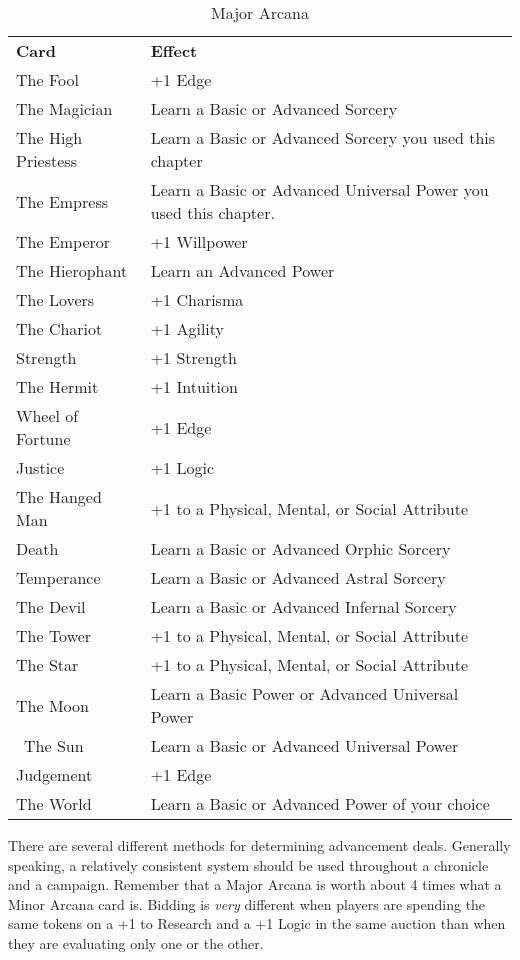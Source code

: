 \begin{table}[htb]
 \caption{Major Arcana} \centering
\begin{tabular}{l l}
\textbf{Card} & \textbf{Effect}\\
The Fool & +1 Edge\\
The Magician & Learn a Basic or Advanced Sorcery\\
The High Priestess & Learn a Basic or Advanced Sorcery you used this chapter\\
The Empress & Learn a Basic or Advanced Universal Power  you used this chapter.\\
The Emperor & +1 Willpower\\
The Hierophant & Learn an Advanced Power\\
The Lovers & +1 Charisma\\
The Chariot & +1 Agility\\
Strength & +1 Strength\\
The Hermit & +1 Intuition\\
Wheel of Fortune & +1 Edge\\
Justice & +1 Logic\\
The Hanged Man & +1 to a Physical, Mental, or Social Attribute\\
Death & Learn a Basic or Advanced Orphic Sorcery\\
Temperance & Learn a Basic or Advanced Astral Sorcery\\
The Devil & Learn a Basic or Advanced Infernal Sorcery\\
The Tower & +1 to a Physical, Mental, or Social Attribute\\
The Star & +1 to a Physical, Mental, or Social Attribute\\
The Moon & Learn a Basic Power or Advanced Universal Power\\\
The Sun & Learn a Basic or Advanced Universal Power\\
Judgement & +1 Edge\\
The World & Learn a Basic or Advanced Power of your choice\\
\end{tabular}
\end{table}

There are several different methods for determining advancement deals. Generally speaking, a relatively consistent system should be used throughout a chronicle and a campaign. Remember that a Major Arcana is worth about 4 times what a Minor Arcana card is. Bidding is \textit{very} different when players are spending the same tokens on a +1 to Research and a +1 Logic in the same auction than when they are evaluating only one or the other.

